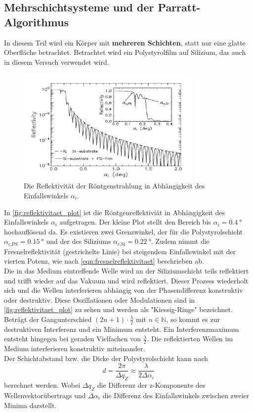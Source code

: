 \subsection{Mehrschichtsysteme und der Parratt-Algorithmus}
In diesem Teil wird ein Körper mit \textbf{mehreren Schichten}, statt nur eine glatte Oberfläche betrachtet.
Betrachtet wird ein Polystyrolfilm auf Silizium, das auch in diesem Versuch verwendet wird.
\begin{figure}
    \centering
    \includegraphics[width=0.8\textwidth]{content/data/reflektivitaet_plot.jpg}
    \caption{Die Reflektivität der Röntgenstrahlung in Abhängigkeit des Einfallswinkels $\alpha_i$.\cite[8]{alte_anleitung}}
    \label{fig:reflektivitaet_plot}
\end{figure}
In \autoref{fig:reflektivitaet_plot} ist die Röntgenreflektiviät in Abhängigkeit des Einfallswinkels $\alpha_i$ aufgetragen.
Der kleine Plot stellt den Bereich bis $\alpha_i = \SI{0.4}{\degree}$ hochauflösend da.
Es existieren zwei Grenzwinkel, der für die Polystyrolschicht $\alpha_\text{c,PS} = \SI{0.15}{\degree}$ und der des Siliziums $\alpha_\text{c,Si} = \SI{0.22}{\degree}$.
Zudem nimmt die Fresnelreflektivität (gestrichelte Linie) bei steigendem Einfallswinkel mit der vierten Potenz, wie nach \autoref{eqn:fresnelreflektivitaet} beschrieben ab.
\\
Die in das Medium eintreffende Welle wird an der Siliziumschicht teils reflektiert und trifft wieder auf das Vakuum und wird reflektiert.
Dieser Prozess wiederholt sich und die Wellen interferieren abhängig von der Phasendifferenz konstruktiv oder destruktiv.
Diese Oszillationen oder Modulationen sind in \autoref{fig:reflektivitaet_plot} zu sehen und werden als "Kiessig-Ringe" bezeichnet.
Beträgt der Gangunterschied $(2n+1) \cdot \frac{\lambda}{2}$ mit $n \in \mathbb{N}$, so kommt es zur destruktiven Interferenz und ein Minimum entsteht.
Ein Interferenzmaximum entsteht hingegen bei geraden Vielfachen von $\frac{\lambda}{2}$.
Die reflektierten Wellen im Medium interferieren konstruktiv miteinander.
\\
Der Schichtabstand bzw. die Dicke der Polystyrolschicht kann nach
\begin{equation}
    d = \frac{2\pi}{\Delta q_Z} \approx \frac{\lambda}{2 \Delta \alpha_i}
    \label{eqn:abstand_schicht}
\end{equation}
berechnet werden.
Wobei $\Delta q_Z$ die Differenz der z-Komponente des Wellenvektorübertrags und $\Delta \alpha_i$ die Differenz des Einfallswinkels zwischen zweier Minima darstellt.
\FloatBarrier

